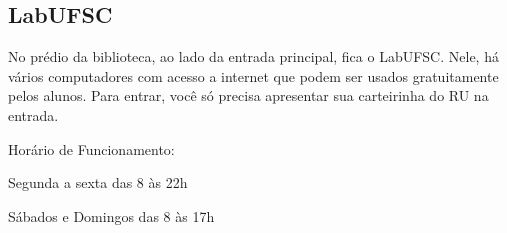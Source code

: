 \subsection{LabUFSC}
No prédio da biblioteca, ao lado da entrada principal, fica o LabUFSC. Nele, há vários computadores com acesso a internet que podem ser usados gratuitamente pelos alunos. Para entrar, você só precisa apresentar sua carteirinha do RU na entrada.

Horário de Funcionamento:

Segunda a sexta das 8 às 22h

Sábados e Domingos das 8 às 17h
